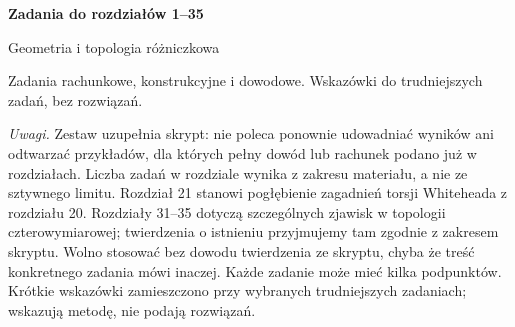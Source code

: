 \documentclass[11pt,a4paper,oneside,openany]{book}
\begin{document}
\frontmatter
\begin{center}
{\LARGE\bfseries Zadania do rozdziałów 1--35}\par\vspace{.8em}
{\large Geometria i topologia różniczkowa}\par\vspace{.8em}
Zadania rachunkowe, konstrukcyjne i dowodowe. Wskazówki do trudniejszych zadań, bez rozwiązań.
\end{center}
\bigskip
\noindent\textit{Uwagi.} Zestaw uzupełnia skrypt: nie poleca ponownie
udowadniać wyników ani odtwarzać przykładów, dla których
pełny dowód lub rachunek podano już w rozdziałach.
Liczba zadań w rozdziale wynika z zakresu materiału, a nie ze sztywnego limitu.
Rozdział 21 stanowi pogłębienie zagadnień torsji Whiteheada
z rozdziału 20. Rozdziały 31--35 dotyczą szczególnych zjawisk
w topologii czterowymiarowej; twierdzenia o istnieniu przyjmujemy
tam zgodnie z zakresem skryptu.
Wolno stosować bez dowodu twierdzenia ze skryptu, chyba że treść
konkretnego zadania mówi inaczej. Każde zadanie może mieć kilka podpunktów. Krótkie wskazówki zamieszczono przy wybranych trudniejszych zadaniach; wskazują metodę, nie podają rozwiązań.
\tableofcontents
\mainmatter
\end{document}
